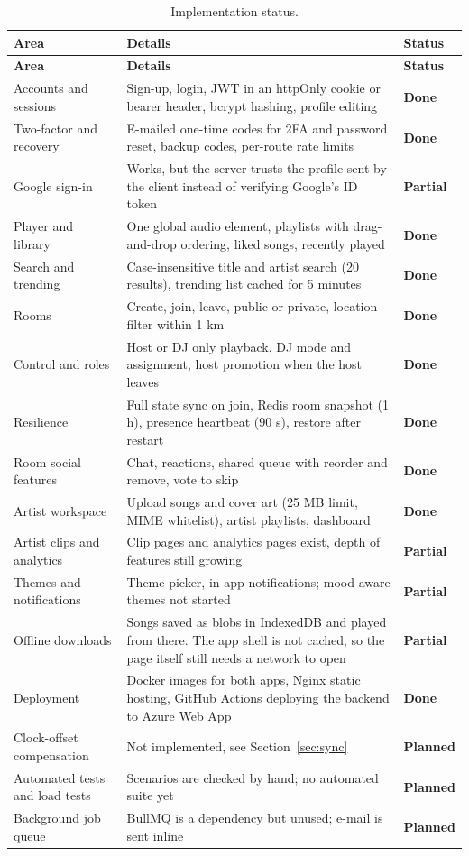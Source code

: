 \documentclass[11pt,a4paper]{article}
\newcommand{\done}{\textcolor{green!45!black}{\textbf{Done}}}
\newcommand{\partialstatus}{\textcolor{orange!80!black}{\textbf{Partial}}}
\newcommand{\planned}{\textcolor{red!60!black}{\textbf{Planned}}}
\begin{document}
\footnotesize
\begin{longtable}{@{}>{\raggedright\arraybackslash}p{3.8cm}>{\raggedright\arraybackslash}p{9.4cm}l@{}}
\caption{Implementation status.}\label{tab:status}\\
\toprule
\textbf{Area} & \textbf{Details} & \textbf{Status} \\
\midrule
\endfirsthead
\toprule
\textbf{Area} & \textbf{Details} & \textbf{Status} \\
\midrule
\endhead
\bottomrule
\endfoot
Accounts and sessions & Sign-up, login, JWT in an httpOnly cookie or bearer header, bcrypt hashing, profile editing & \done \\
Two-factor and recovery & E-mailed one-time codes for 2FA and password reset, backup codes, per-route rate limits & \done \\
Google sign-in & Works, but the server trusts the profile sent by the client instead of verifying Google's ID token & \partialstatus \\
Player and library & One global audio element, playlists with drag-and-drop ordering, liked songs, recently played & \done \\
Search and trending & Case-insensitive title and artist search (20 results), trending list cached for 5 minutes & \done \\
Rooms & Create, join, leave, public or private, location filter within 1 km & \done \\
Control and roles & Host or DJ only playback, DJ mode and assignment, host promotion when the host leaves & \done \\
Resilience & Full state sync on join, Redis room snapshot (1 h), presence heartbeat (90 s), restore after restart & \done \\
Room social features & Chat, reactions, shared queue with reorder and remove, vote to skip & \done \\
Artist workspace & Upload songs and cover art (25 MB limit, MIME whitelist), artist playlists, dashboard & \done \\
Artist clips and analytics & Clip pages and analytics pages exist, depth of features still growing & \partialstatus \\
Themes and notifications & Theme picker, in-app notifications; mood-aware themes not started & \partialstatus \\
Offline downloads & Songs saved as blobs in IndexedDB and played from there. The app shell is not cached, so the page itself still needs a network to open & \partialstatus \\
Deployment & Docker images for both apps, Nginx static hosting, GitHub Actions deploying the backend to Azure Web App & \done \\
Clock-offset compensation & Not implemented, see Section~\ref{sec:sync} & \planned \\
Automated tests and load tests & Scenarios are checked by hand; no automated suite yet & \planned \\
Background job queue & BullMQ is a dependency but unused; e-mail is sent inline & \planned \\
\end{longtable}
\normalsize
\end{document}
